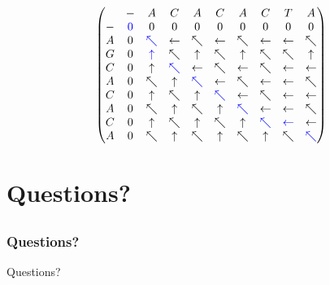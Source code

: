 \documentclass{beamer}
\begin{document}
\begin{frame}
	\frametitle{}
	\[
	\begin{pmatrix}
		  & - & A & C & A & C & A & C & T & A \\
		- & \color{blue}0 & 0 & 0 & 0 & 0 & 0 & 0 & 0 & 0 \\
		A & 0 & \color{blue}\nwarrow & \leftarrow & \nwarrow & \leftarrow & \nwarrow & \leftarrow & \leftarrow & \nwarrow \\
		G & 0 & \color{blue}\uparrow & \nwarrow & \uparrow & \nwarrow & \uparrow & \nwarrow & \nwarrow & \uparrow \\
		C & 0 & \uparrow & \color{blue}\nwarrow & \leftarrow & \nwarrow & \leftarrow & \nwarrow & \leftarrow & \leftarrow \\
		A & 0 & \nwarrow & \uparrow & \color{blue}\nwarrow & \leftarrow & \nwarrow & \leftarrow & \leftarrow & \nwarrow \\
		C & 0 & \uparrow & \nwarrow & \uparrow & \color{blue}\nwarrow & \leftarrow & \nwarrow & \leftarrow & \leftarrow \\
		A & 0 & \nwarrow & \uparrow & \nwarrow & \uparrow & \color{blue}\nwarrow & \leftarrow & \leftarrow & \nwarrow \\
		C & 0 & \uparrow & \nwarrow & \uparrow & \nwarrow & \uparrow & \color{blue}\nwarrow & \color{blue}\leftarrow & \leftarrow \\
		A & 0 & \nwarrow & \uparrow & \nwarrow & \uparrow & \nwarrow & \uparrow & \nwarrow & \color{blue}\nwarrow
	\end{pmatrix}
	\]
\end{frame}

\section{Questions?}
\subsection*{}

\begin{frame}
	\frametitle{Questions?}
	\begin{center}
		\large Questions?
	\end{center}
\end{frame}
\end{document}
